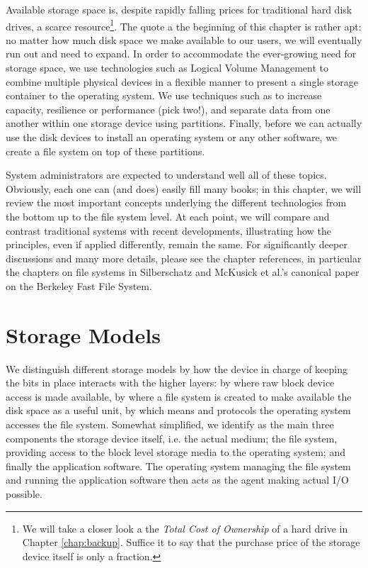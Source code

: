 Available storage space is, despite rapidly falling
prices for traditional hard disk drives, a scarce
resource\footnote{We will take a closer look a the
{\em Total Cost of Ownership} of a hard drive in Chapter
\ref{chap:backup}.  Suffice it to say that the
purchase price of the storage device itself is only a
fraction.}.  The quote a the beginning of this chapter
is rather apt: no matter how much disk space we make
available to our users, we will eventually run out and
need to expand.  In order to accommodate the
ever-growing need for storage space, we use
technologies such as Logical Volume
Management to combine
multiple physical devices in a flexible manner to
present a single storage container to the operating
system.  We use techniques such as
 to increase capacity,
resilience or performance (pick two!), and separate
data from one another within one storage device using
partitions.  Finally, before we can actually use the
disk devices to install an operating system or any
other software, we create a file system on top of
these partitions.

System administrators are expected to understand well
all of these topics.  Obviously, each one can (and
does) easily fill many books; in this chapter, we will
review the most important concepts underlying the
different technologies from the bottom up to the file
system level.  At each point, we will compare and
contrast traditional systems with recent developments,
illustrating how the principles, even if applied
differently, remain the same.  For significantly
deeper discussions and many more details, please see
the chapter references, in particular the chapters on
file systems in
Silberschatz\cite{filesystems:silberschatz} and McKusick et al.'s canonical paper on the Berkeley Fast
File System\cite{filesystems:ffs}.


\section{Storage Models}
\label{file systems:storage-models}

We distinguish different storage models by how the
device in charge of keeping the bits in place
interacts with the higher layers: by where raw block
device access is made available, by where a file
system is created to make available the disk space as
a useful unit, by which means and protocols the
operating system accesses the file system.  Somewhat
simplified, we identify as the main three components
the storage device itself, i.e. the actual medium; the
file system, providing access to the block level
storage media to the operating system; and finally the
application software.  The operating system managing
the file system and running the application software
then acts as the agent making actual I/O possible.

